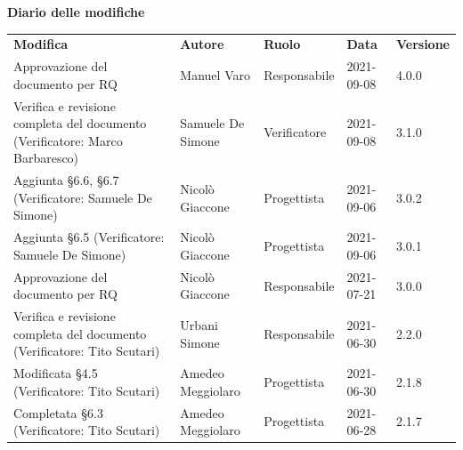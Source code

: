 \documentclass[a4paper]{article}
\begin{document}
\begin{center}
    \textbf{\Large Diario delle modifiche}\\
    \vspace{10px}
    \begin{table}[h!]
        \centering
        \renewcommand{\arraystretch}{1.8}
        \begin{tabular}{p{160px} p{90px} p{70px} p{55px} p{45px}}
            \rowcolor{logo!70} \textbf{Modifica}                          & \textbf{Autore}   & \textbf{Ruolo} & \textbf{Data} & \textbf{Versione} \\
            Approvazione del documento per RQ                                                                       & Manuel Varo       & Responsabile   & 2021-09-08    & 4.0.0             \\
            Verifica e revisione completa del documento \newline(Verificatore: Marco Barbaresco)                    & Samuele De Simone & Verificatore   & 2021-09-08    & 3.1.0             \\
            Aggiunta \S 6.6, \S 6.7 \newline(Verificatore: Samuele De Simone)                                       & Nicolò Giaccone   & Progettista    & 2021-09-06    & 3.0.2             \\
            Aggiunta \S 6.5 \newline(Verificatore: Samuele De Simone)                                               & Nicolò Giaccone   & Progettista    & 2021-09-06    & 3.0.1             \\
            Approvazione del documento per RQ                                                                       & Nicolò Giaccone   & Responsabile   & 2021-07-21    & 3.0.0             \\
            Verifica e revisione completa del documento \newline(Verificatore: Tito Scutari)                        & Urbani Simone     & Responsabile   & 2021-06-30    & 2.2.0             \\
            Modificata \S 4.5 \newline(Verificatore: Tito Scutari)                                                  & Amedeo Meggiolaro & Progettista    & 2021-06-30    & 2.1.8             \\
            Completata \S 6.3 \newline(Verificatore: Tito Scutari)                                                  & Amedeo Meggiolaro & Progettista    & 2021-06-28    & 2.1.7             \\

\end{tabular}
\end{table}
\end{center}
\end{document}
